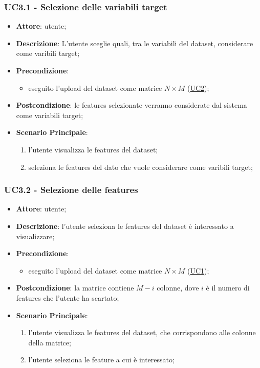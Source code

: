     \subsubsection{UC3.1 - Selezione delle variabili target}
    \label{uc3.1}
    \begin{itemize}
    \item \textbf{Attore}: utente;
    \item \textbf{Descrizione}: L'utente sceglie quali, tra le variabili del dataset, considerare come varibili target;
    \item \textbf{Precondizione}:
    \begin{itemize}
        \item eseguito l'upload del dataset come matrice $N\times M$ (\hyperref[uc2]{UC2});
    \end{itemize}
    \item \textbf{Postcondizione}: le features selezionate verranno considerate dal sistema come variabili target;
    \item \textbf{Scenario Principale}: 
    \begin{enumerate}
        \item l'utente visualizza le features del dataset;
        \item seleziona le features del dato che vuole considerare come varibili target;
    \end{enumerate}  
    \end{itemize}
    
    
    
    
    \subsubsection{UC3.2 - Selezione delle features}
    \label{uc3.2}

    \begin{itemize}
    \item \textbf{Attore}: utente;
    \item \textbf{Descrizione}: l'utente seleziona le features del dataset è interessato a visualizzare;
    \item \textbf{Precondizione}: 
     \begin{itemize}
        \item eseguito l'upload del dataset come matrice $N\times M$ (\hyperref[uc1]{UC1});
    \end{itemize}
    \item \textbf{Postcondizione}: la matrice contiene $M-i$ colonne, dove $i$ è il numero di features che l'utente ha scartato;
    \item \textbf{Scenario Principale}: 
    \begin{enumerate}
        \item l'utente visualizza le features del dataset, che corrispondono alle colonne della matrice;
        \item l'utente seleziona le feature a cui è interessato;
    \end{enumerate}
    \end{itemize}
    
